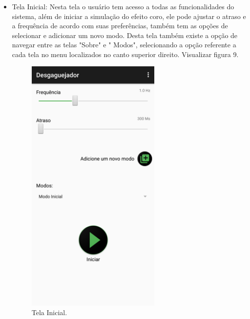 \begin{itemize}
	\item Tela Inicial: Nesta tela o usu\'ario tem acesso a todas as funcionalidades do sistema, al\'em de iniciar a simula\c{c}\~ao do efeito coro, ele pode ajustar o atraso e a frequ\^encia de acordo com suas prefer\^encias, tamb\'em tem as op\c{c}\~oes de selecionar e adicionar um novo modo. Desta tela tamb\'em existe a op\c{c}\~ao de navegar entre as telas "Sobre" e " Modos", selecionando a op\c{c}\~ao referente a cada tela no menu localizados no canto superior direito. Visualizar figura 9.
	\begin{figure}[H]
		\centering
		\caption[Tela Inicial]{Tela Inicial. \label{fig:prototipotelainicial}}
		\includegraphics[height=13cm]{./Figuras/prototipo_telainicial.png}%
	\end{figure}
	

\end{itemize}

